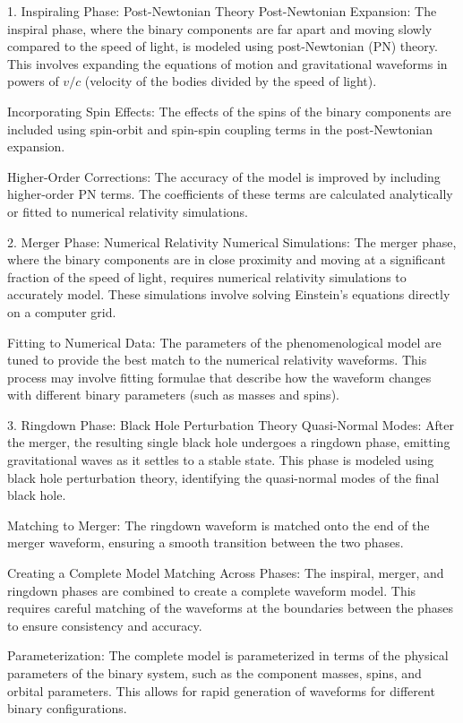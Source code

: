 1. Inspiraling Phase: Post-Newtonian Theory
    Post-Newtonian Expansion: The inspiral phase, where the binary components are far apart and moving slowly compared to the speed of light, is modeled using post-Newtonian (PN) theory. This involves expanding the equations of motion and gravitational waveforms in powers of $v/c$ (velocity of the bodies divided by the speed of light).

    Incorporating Spin Effects: The effects of the spins of the binary components are included using spin-orbit and spin-spin coupling terms in the post-Newtonian expansion.

    Higher-Order Corrections: The accuracy of the model is improved by including higher-order PN terms. The coefficients of these terms are calculated analytically or fitted to numerical relativity simulations.

2. Merger Phase: Numerical Relativity
    Numerical Simulations: The merger phase, where the binary components are in close proximity and moving at a significant fraction of the speed of light, requires numerical relativity simulations to accurately model. These simulations involve solving Einstein’s equations directly on a computer grid.

    Fitting to Numerical Data: The parameters of the phenomenological model are tuned to provide the best match to the numerical relativity waveforms. This process may involve fitting formulae that describe how the waveform changes with different binary parameters (such as masses and spins).

3. Ringdown Phase: Black Hole Perturbation Theory
    Quasi-Normal Modes: After the merger, the resulting single black hole undergoes a ringdown phase, emitting gravitational waves as it settles to a stable state. This phase is modeled using black hole perturbation theory, identifying the quasi-normal modes of the final black hole.

    Matching to Merger: The ringdown waveform is matched onto the end of the merger waveform, ensuring a smooth transition between the two phases.

Creating a Complete Model
    Matching Across Phases: The inspiral, merger, and ringdown phases are combined to create a complete waveform model. This requires careful matching of the waveforms at the boundaries between the phases to ensure consistency and accuracy.

    Parameterization: The complete model is parameterized in terms of the physical parameters of the binary system, such as the component masses, spins, and orbital parameters. This allows for rapid generation of waveforms for different binary configurations.

